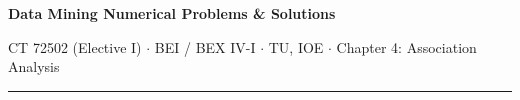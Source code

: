 \documentclass[10pt]{article}
\begin{document}
{\LARGE\bfseries Data Mining \gap\textcolor{sub}{Numerical Problems \& Solutions}}\par
{\footnotesize\color{sub} CT 72502 (Elective I) $\cdot$ BEI / BEX IV-I $\cdot$ TU, IOE $\cdot$ Chapter 4: Association Analysis}
\vspace{3pt}\hrule\vspace{4pt}




\end{document}
